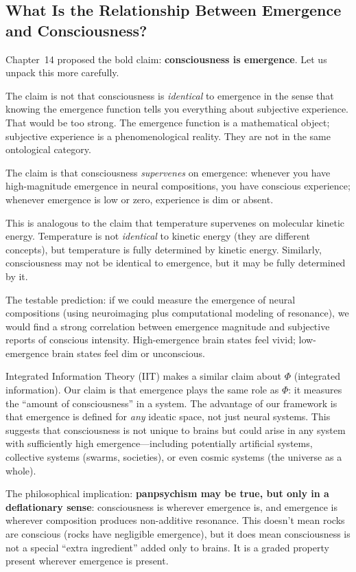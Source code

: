 \subsection{What Is the Relationship Between Emergence and Consciousness?}

Chapter~14 proposed the bold claim: \textbf{consciousness is emergence}. Let
us unpack this more carefully.

The claim is not that consciousness is \emph{identical} to emergence in the
sense that knowing the emergence function tells you everything about subjective
experience. That would be too strong. The emergence function is a mathematical
object; subjective experience is a phenomenological reality. They are not in
the same ontological category.

The claim is that consciousness \emph{supervenes} on emergence: whenever you
have high-magnitude emergence in neural compositions, you have conscious
experience; whenever emergence is low or zero, experience is dim or absent.

This is analogous to the claim that temperature supervenes on molecular
kinetic energy. Temperature is not \emph{identical} to kinetic energy (they
are different concepts), but temperature is fully determined by kinetic
energy. Similarly, consciousness may not be identical to emergence, but it
may be fully determined by it.

The testable prediction: if we could measure the emergence of neural compositions
(using neuroimaging plus computational modeling of resonance), we would find
a strong correlation between emergence magnitude and subjective reports of
conscious intensity. High-emergence brain states feel vivid; low-emergence
brain states feel dim or unconscious.

Integrated Information Theory (IIT) makes a similar claim about $\Phi$
(integrated information). Our claim is that emergence plays the same role as
$\Phi$: it measures the ``amount of consciousness'' in a system. The advantage
of our framework is that emergence is defined for \emph{any} ideatic space,
not just neural systems. This suggests that consciousness is not unique to
brains but could arise in any system with sufficiently high emergence---including
potentially artificial systems, collective systems (swarms, societies), or
even cosmic systems (the universe as a whole).

The philosophical implication: \textbf{panpsychism may be true, but only in a
deflationary sense}: consciousness is wherever emergence is, and emergence is
wherever composition produces non-additive resonance. This doesn't mean rocks
are conscious (rocks have negligible emergence), but it does mean consciousness
is not a special ``extra ingredient'' added only to brains. It is a graded
property present wherever emergence is present.


